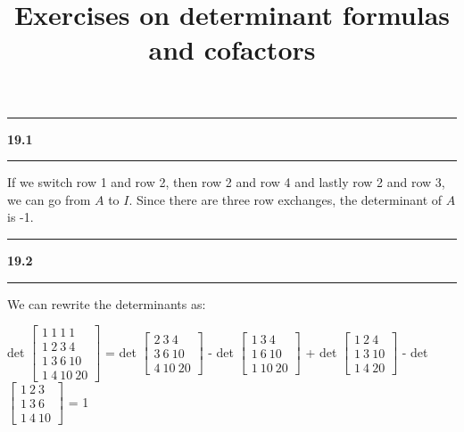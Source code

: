\documentclass[11pt]{article}
\newcommand\question[2]{\vspace{.25in}\hrule\textbf{#1 #2}\vspace{.5em}\hrule\vspace{.10in}}
\begin{document}
\raggedright
\newcommand\NAME{Haiying Cui}  %
\newcommand\ANDREWID{Christy}     %
\newcommand\HWNUM{19}              %

\title{Exercises on determinant formulas and cofactors}
\maketitle

\question{19.1}{}
If we switch row 1 and row 2, then row 2 and row 4 and lastly row 2 and row 3, we can go from \(A\) to \(I\). Since there are three row exchanges, the determinant of \(A\) is -1.

\question{19.2}{}
We can rewrite the determinants as:

det \(\begin{bmatrix} 1 \ 1 \ 1 \ 1 \\ 1 \ 2 \ 3 \ 4 \\ 1 \ 3 \ 6 \ 10 \\ 1 \ 4 \ 10 \ 20 \end{bmatrix}\) = det \(\begin{bmatrix} 2 \ 3 \ 4 \\ 3 \ 6 \ 10 \\ 4 \ 10 \ 20 \end{bmatrix}\) - det \(\begin{bmatrix} 1 \ 3 \ 4 \\ 1 \ 6 \ 10 \\ 1 \ 10 \ 20 \end{bmatrix}\) + det \(\begin{bmatrix} 1 \ 2 \ 4 \\ 1 \ 3 \ 10 \\ 1 \ 4 \ 20 \end{bmatrix}\) - det \(\begin{bmatrix} 1 \ 2 \ 3 \\ 1 \ 3 \ 6 \\ 1 \ 4 \ 10 \end{bmatrix}\) = 1
\end{document}
